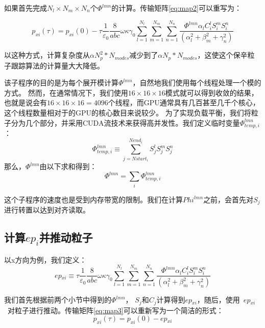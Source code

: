 如果首先完成${{N}_{l}}\times{{N}_{m}}\times{{N}_{n}}$个$\Phi^{lmn}$的计算。传输矩阵\ref{eq:map2}可以重写为：

\begin{equation}\label{eq:map3}
{{p}_{xi}}(\tau )={{p}_{xi}}(0)-\tau \frac{1}{{{\varepsilon }_{0}}}\frac{8}{abc}\omega \kappa {{\gamma }_{0}}\sum\limits_{l=1}^{{{N}_{l}}}{\sum\limits_{m=1}^{{{N}_{m}}}{\sum\limits_{n=1}^{{{N}_{n}}}{\frac{\Phi^{lmn}{{\alpha }_{l}}C_{i}^{l}S_{i}^{m}S_{i}^{n}}{(\alpha _{l}^{2}+\beta _{m}^{2}+\gamma _{n}^{2})}}}}
\end{equation}

以这种方式，计算复杂度从$\alpha N_p^2*N_{modes}$减少到了$\alpha  N_p*N_{modes}$，这使这个保辛粒子跟踪算法的计算量大大降低。

该子程序的目的是为每个展开模计算$\Phi^{lmn}$，自然地我们使用每个线程处理一个模的方式。
然而，在通常情况下，我们使用$16\times 16\times 16$模式就可以得到收敛的结果，也就是说会有$16\times 16\times 16 = 4096$个线程，而GPU通常具有几百甚至几千个核心，这个线程数量相对于的GPU的核心数目来说较少。
为了实现负载平衡，我们将粒子分为几个部分，并采用CUDA流技术来获得高并发性。我们定义临时变量$\Phi^{lmn}_{temp,i}$：
\begin{equation}
\Phi^{lmn}_{temp,i}\equiv \sum\limits_{j=Nstar{{t}_{i}}}^{Nen{{d}_{i}}}{S_{j}^{l}S_{j}^{m}S_{j}^{n}}
\end{equation}
那么，$\Phi^{lmn}$由以下求和得到：
\begin{equation}
\Phi^{lmn}=\sum\limits_{i}{\Phi^{lmn}_{temp,i}}
\end{equation}

这个子程序的速度也是受到内存带宽的限制。我们在计算$Phi^{lmn}$之前，会首先对$S_{j}$进行转置以达到对齐读取。

\subsection{计算$ep_i$并推动粒子}
以x方向为例，我们定义：
\begin{equation}
ep{_{xi}}\equiv \tau \frac{1}{{{\varepsilon }_{0}}}\frac{8}{abc}\omega \kappa {{\gamma }_{0}}\sum\limits_{l=1}^{{{N}_{l}}}{\sum\limits_{m=1}^{{{N}_{m}}}{\sum\limits_{n=1}^{{{N}_{n}}}{\frac{\Phi^{lmn}{{\alpha }_{l}}C_{i}^{l}S_{i}^{m}S_{i}^{n}}{(\alpha _{l}^{2}+\beta _{m}^{2}+\gamma _{n}^{2})}}}}
\end{equation}

我们首先根据前两个小节中得到的$\Phi^{lmn}$， $S_{j}^{{}}$和$C_{j}^{{}}$计算得到$ep{_{xi}}$，随后，使用~$ep{_{xi}}$~对粒子进行推动。传输矩阵\ref{eq:map3}可以重新写为一个简洁的形式：
\begin{equation}\label{eq:map4}
{{p}_{xi}}(\tau )={{p}_{xi}}(0)-ep{_{xi}}
\end{equation}

